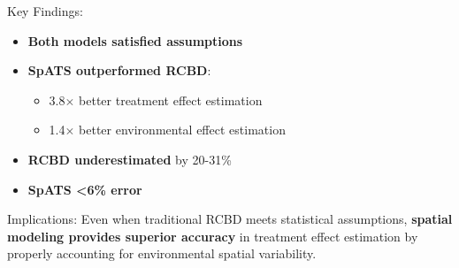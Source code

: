 \documentclass[aspectratio=43]{beamer}
\begin{document}
\begin{frame}
\begin{columns}
        \begin{column}{0.5\textwidth}
            \begin{alertblock}{\small Key Findings:}
                \begin{itemize}
                    \footnotesize
                    \item \textbf{Both models satisfied assumptions}
                    \item \textbf{SpATS outperformed RCBD}:
                    \begin{itemize}
                        \scriptsize
                        \item 3.8\ensuremath{\times} better treatment effect estimation
                        \item 1.4\ensuremath{\times} better environmental effect estimation
                    \end{itemize}
                    \item \textbf{RCBD underestimated} by 20-31\%
                    \item \textbf{SpATS <6\% error}
                \end{itemize}
            \end{alertblock}
            
            \begin{block}{\small Implications:}
                \scriptsize
                Even when traditional RCBD meets statistical assumptions, \textbf{spatial modeling provides superior accuracy} in treatment effect estimation by properly accounting for environmental spatial variability.
            \end{block}
        \end{column}
    \end{columns}
\end{frame}
\end{document}
